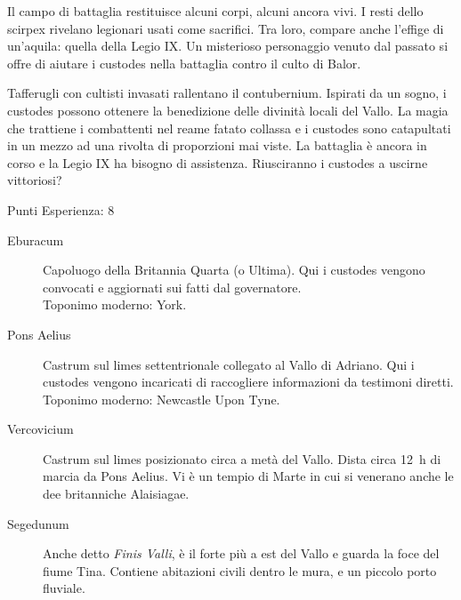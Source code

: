 \documentclass[11.5pt,twocolumn]{article}
\begin{document}
Il campo di battaglia restituisce alcuni corpi, alcuni ancora vivi.
I resti dello scirpex rivelano legionari usati come sacrifici.
Tra loro, compare anche l'effige di un'aquila: quella della Legio IX.
Un misterioso personaggio venuto dal passato si offre di aiutare i custodes nella battaglia contro il culto di Balor.

Tafferugli con cultisti invasati rallentano il contubernium.
Ispirati da un sogno, i custodes possono ottenere la benedizione delle divinit\`{a} locali del Vallo.
La magia che trattiene i combattenti nel reame fatato collassa e i custodes sono catapultati in un mezzo ad una rivolta di proporzioni mai viste.
La battaglia \`{e} ancora in corso e la Legio IX ha bisogno di assistenza.
Riusciranno i custodes a uscirne vittoriosi?

Punti Esperienza: 8

{}
\begin{description}
\item[Eburacum] Capoluogo della Britannia Quarta (o Ultima). Qui i custodes vengono convocati e aggiornati sui fatti dal governatore. \\Toponimo moderno: York.
\item[Pons Aelius] Castrum sul limes settentrionale collegato al Vallo di Adriano. Qui i custodes vengono incaricati di raccogliere informazioni da testimoni diretti. \\Toponimo moderno: Newcastle Upon Tyne.
\item[Vercovicium] Castrum sul limes posizionato circa a met\`{a} del Vallo. Dista circa 12~h di marcia da Pons Aelius. Vi \`{e} un tempio di Marte in cui si venerano anche le dee britanniche Alaisiagae.
\item[Segedunum] Anche detto \emph{Finis Valli}, \`{e} il forte pi\`{u} a est del Vallo e guarda la foce del fiume Tina. Contiene abitazioni civili dentro le mura, e un piccolo porto fluviale.
\end{description}
\end{document}

